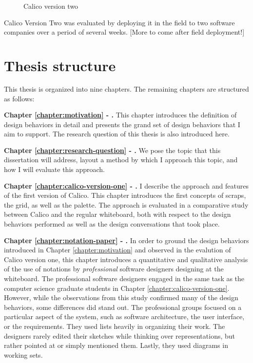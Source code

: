 \documentclass[12pt,fleqn]{ucithesis}
\begin{document}
\begin{figure}
  \centering
   \caption {Calico version two}
   \label{fig:calico-version-two}
\end{figure}

Calico Version Two was evaluated by deploying it in the field to two software companies over a period of several weeks. [More to come after field deployment!]

\section{Thesis structure}

This thesis is organized into nine chapters. The remaining chapters are structured as follows:

\textbf{Chapter \ref{chapter:motivation} - .} This chapter introduces the definition of design behaviors in detail and presents the grand set of design behaviors that I aim to support. The research question of this thesis is also introduced here.

\textbf{Chapter \ref{chapter:research-question} - .} We pose the topic that this dissertation will address, layout a method by which I approach this topic, and how I will evaluate this approach.

\textbf{Chapter \ref{chapter:calico-version-one} - .} I describe the approach and features of the first version of Calico. This chapter introduces the first concepts of scraps, the grid, as well as the palette. The approach is evaluated in a comparative study between Calico and the regular whiteboard, both with respect to the design behaviors performed as well as the design conversations that took place.

\textbf{Chapter \ref{chapter:notation-paper} - .} In order to ground the design behaviors introduced in Chapter \ref{chapter:motivation} and observed in the evalution of Calico version one, this chapter introduces a quantitative and qualitative analysis of the use of notations by \emph{professional} software designers designing at the whiteboard. The professional software designers engaged in the same task as the computer science graduate students in Chapter \ref{chapter:calico-version-one}. However, while the observations from this study confirmed many of the design behaviors, some differences did stand out. The professional groups focused on a particular aspect of the system, such as software architecture, the user interface, or the requirements. They used lists heavily in organizing their work. The designers rarely edited their sketches while thinking over representations, but rather pointed at or simply mentioned them. Lastly, they used diagrams in working sets.
\end{document}
